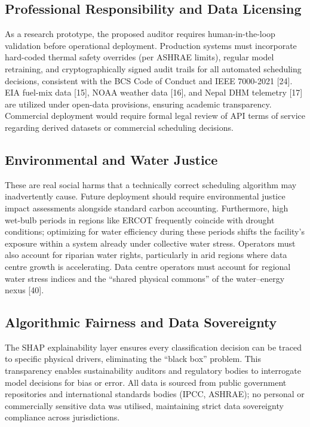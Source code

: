 \documentclass[conference]{IEEEtran}
\begin{document}
\subsection{Professional Responsibility and Data Licensing}
As a research prototype, the proposed auditor requires human-in-the-loop validation before operational deployment. Production systems must incorporate hard-coded thermal safety overrides (per ASHRAE limits), regular model retraining, and cryptographically signed audit trails for all automated scheduling decisions, consistent with the BCS Code of Conduct and IEEE 7000-2021 [24]. EIA fuel-mix data [15], NOAA weather data [16], and Nepal DHM telemetry [17] are utilized under open-data provisions, ensuring academic transparency. Commercial deployment would require formal legal review of API terms of service regarding derived datasets or commercial scheduling decisions.

\subsection{Environmental and Water Justice}
These are real social harms that a technically correct scheduling algorithm may inadvertently cause. Future deployment should require environmental justice impact assessments alongside standard carbon accounting. Furthermore, high wet-bulb periods in regions like ERCOT frequently coincide with drought conditions; optimizing for water efficiency during these periods shifts the facility's exposure within a system already under collective water stress. Operators must also account for riparian water rights, particularly in arid regions where data centre growth is accelerating. Data centre operators must account for regional water stress indices and the ``shared physical commons'' of the water–energy nexus [40].

\subsection{Algorithmic Fairness and Data Sovereignty}
The SHAP explainability layer ensures every classification decision can be traced to specific physical drivers, eliminating the ``black box'' problem. This transparency enables sustainability auditors and regulatory bodies to interrogate model decisions for bias or error. All data is sourced from public government repositories and international standards bodies (IPCC, ASHRAE); no personal or commercially sensitive data was utilised, maintaining strict data sovereignty compliance across jurisdictions.
\end{document}
